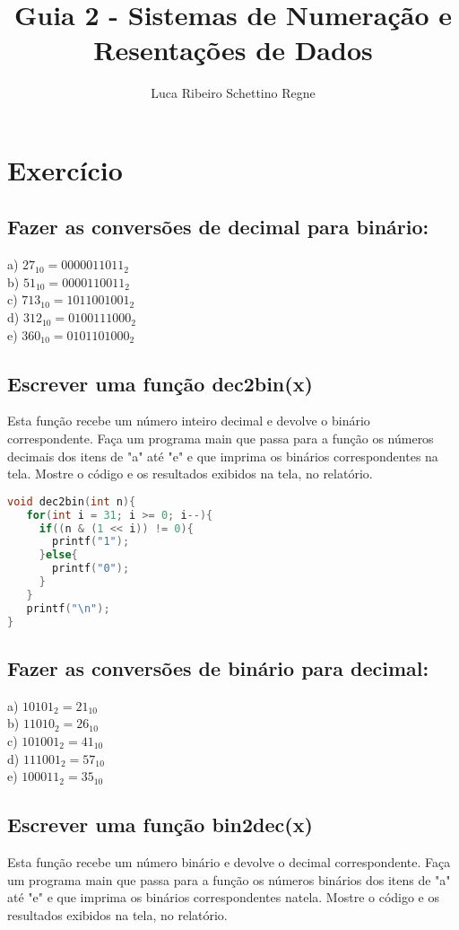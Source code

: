 \documentclass[12pt]{article}
\title{Guia 2 - Sistemas de Numeração e Resentações de Dados}
\author{Luca Ribeiro Schettino Regne}
\begin{document}
 

\maketitle

\section{Exercício}
\subsection{Fazer as conversões de decimal para binário:}
a) $27_{10}  = 0000011011_{2}$\\
b) $51_{10}  = 0000110011_{2}$\\
c) $713_{10} = 1011001001_{2}$\\
d) $312_{10} = 0100111000_{2}$\\
e) $360_{10} = 0101101000_{2}$\\

\subsection{Escrever uma função dec2bin(x)}
Esta função recebe um número inteiro decimal e devolve o binário correspondente. 
Faça um programa main que passa para a função os números decimais dos itens de 
"a" até "e" e que imprima os binários correspondentes na tela. Mostre o código 
e os resultados exibidos na tela, no relatório.

\begin{lstlisting}[language=C]
void dec2bin(int n){
   for(int i = 31; i >= 0; i--){
     if((n & (1 << i)) != 0){
       printf("1");
     }else{
       printf("0");
     } 
   }
   printf("\n");
}
\end{lstlisting}

\subsection{Fazer as conversões de binário para decimal:}
a) $10101_{2} = 21_{10}$\\
b) $11010_{2} = 26_{10}$\\
c) $101001_{2} = 41_{10}$\\
d) $111001_{2} = 57_{10}$\\
e) $100011_{2} = 35_{10}$\\

\subsection{Escrever uma função bin2dec(x)}
Esta função recebe um número binário e devolve o decimal correspondente. Faça um 
programa main que passa para a função os números binários dos itens de "a" até "e" 
e que imprima os binários correspondentes natela. Mostre o código e os resultados 
exibidos na tela, no relatório.
\end{document}
